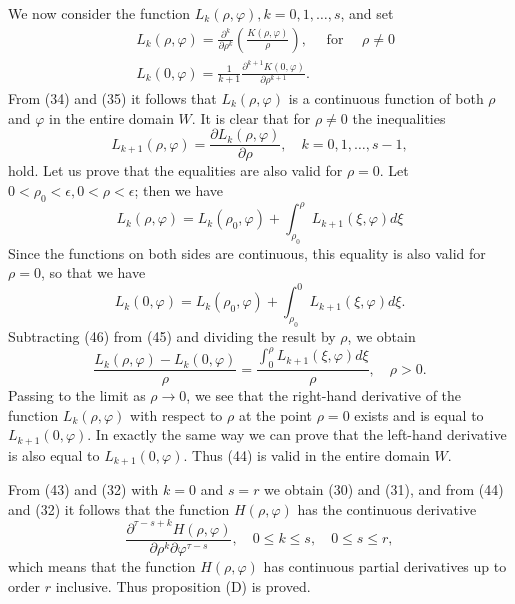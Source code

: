 \documentclass[10pt,a5paper]{book}
\makeatletter
\theoremstyle{plain}
\theoremstyle{definition}
\theoremstyle{remark}
\renewenvironment{proof}[1][\proofname]{\par
  \pushQED{\qed}%
  \normalfont\topsep6\p@\@plus6\p@\relax
  \trivlist
  \item\relax{\itshape #1\@addpunct{.}}\hspace\labelsep\ignorespaces
}{\popQED\endtrivlist\@endpefalse}
\makeatother
\begin{document}
\begin{proof}
We now consider the function $L_{k}(\rho, \varphi), k=0,1, \ldots, s$, and set
\begin{align*}
& L_{k}(\rho, \varphi)=\frac{\partial^{k}}{\partial \rho^{k}}\left(\frac{K(\rho, \varphi)}{\rho}\right), \quad \text { for } \quad \rho \neq 0  \tag{43}\\
& L_{k}(0, \varphi)=\frac{1}{k+1} \frac{\partial^{k+1} K(0, \varphi)}{\partial \rho^{k+1}} .
\end{align*}
From (34) and (35) it follows that $L_{k}(\rho, \varphi)$ is a continuous function of both $\rho$ and $\varphi$ in the entire domain $W$. It is clear that for $\rho \neq 0$ the inequalities
\begin{equation*}
L_{k+1}(\rho, \varphi)=\frac{\partial L_{k}(\rho, \varphi)}{\partial \rho}, \quad k=0,1, \ldots, s-1, \tag{44}
\end{equation*}
hold. Let us prove that the equalities are also valid for $\rho=0$. Let $0<\rho_{0}<\epsilon, 0<\rho<\epsilon$; then we have
\begin{equation*}
L_{k}(\rho, \varphi)=L_{k}\left(\rho_{0}, \varphi\right)+\int_{\rho_{0}}^{\rho} L_{k+1}(\xi, \varphi) d \xi \tag{45}
\end{equation*}
Since the functions on both sides are continuous, this equality is also valid
for $\rho=0$, so that we have
\begin{equation*}
L_{k}(0, \varphi)=L_{k}\left(\rho_{0}, \varphi\right)+\int_{\rho_{0}}^{0} L_{k+1}(\xi, \varphi) d \xi . \tag{46}
\end{equation*}
Subtracting (46) from (45) and dividing the result by $\rho$, we obtain
\[
\frac{L_{k}(\rho, \varphi)-L_{k}(0, \varphi)}{\rho}=\frac{\int_{0}^{\rho} L_{k+1}(\xi, \varphi) d \xi}{\rho}, \quad \rho>0 .
\]
Passing to the limit as $\rho \rightarrow 0$, we see that the right-hand derivative of the function $L_{k}(\rho, \varphi)$ with respect to $\rho$ at the point $\rho=0$ exists and is equal to $L_{k+1}(0, \varphi)$. In exactly the same way we can prove that the left-hand derivative is also equal to $L_{k+1}(0, \varphi)$. Thus (44) is valid in the entire domain $W$.

From (43) and (32) with $k=0$ and $s=r$ we obtain (30) and (31), and from (44) and (32) it follows that the function $H(\rho, \varphi)$ has the continuous derivative
\[
\frac{\partial^{\tau-s+k} H(\rho, \varphi)}{\partial \rho^{k} \partial \varphi^{\tau-s}}, \quad 0 \leq k \leq s, \quad 0 \leq s \leq r,
\]
which means that the function $H(\rho, \varphi)$ has continuous partial derivatives up to order $r$ inclusive. Thus proposition (D) is proved.
\end{proof}
\end{document}
